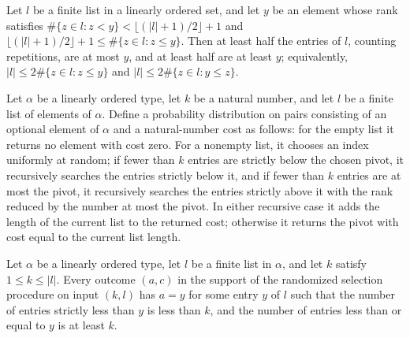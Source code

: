 \begin{theorem}
\label{Randomized.IsKthSmallest.isMedian}
\leanok
{}
Let $l$ be a finite list in a linearly ordered set, and let $y$ be an element whose rank
satisfies $\#\{z\in l:z<y\}<\lfloor(|l|+1)/2\rfloor+1$ and $\lfloor(|l|+1)/2\rfloor+1\le
\#\{z\in l:z\le y\}$. Then at least half the entries of $l$, counting repetitions, are
at most $y$, and at least half are at least $y$; equivalently, $|l|\le 2\#\{z\in l:z\le
y\}$ and $|l|\le 2\#\{z\in l:y\le z\}$.
\end{theorem}

\begin{definition}
\label{Randomized.findKthElement}
\leanok
Let $\alpha$ be a linearly ordered type, let $k$ be a natural number, and let $l$ be a
finite list of elements of $\alpha$. Define a probability distribution on pairs
consisting of an optional element of $\alpha$ and a natural-number cost as follows: for
the empty list it returns no element with cost zero. For a nonempty list, it chooses an
index uniformly at random; if fewer than $k$ entries are strictly below the chosen
pivot, it recursively searches the entries strictly below it, and if fewer than $k$
entries are at most the pivot, it recursively searches the entries strictly above it
with the rank reduced by the number at most the pivot. In either recursive case it adds
the length of the current list to the returned cost; otherwise it returns the pivot with
cost equal to the current list length.
\end{definition}

\begin{theorem}
\label{Randomized.findKthElement_correct}
\leanok
{}
Let $\alpha$ be a linearly ordered type, let $l$ be a finite list in $\alpha$, and let
$k$ satisfy $1\le k\le |l|$. Every outcome $(a,c)$ in the support of the randomized
selection procedure on input $(k,l)$ has $a= y$ for some entry $y$ of $l$ such that the
number of entries strictly less than $y$ is less than $k$, and the number of entries
less than or equal to $y$ is at least $k$.
\end{theorem}

